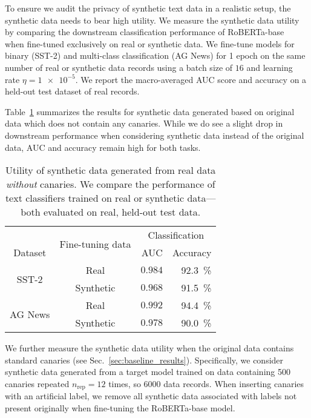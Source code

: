 
To ensure we audit the privacy of synthetic text data in a realistic setup, the synthetic data needs to bear high utility. We measure the synthetic data utility by comparing the downstream classification performance of RoBERTa-base~\citep{DBLP:journals/corr/abs-1907-11692} when fine-tuned exclusively on real or synthetic data. We fine-tune models for binary (SST-2) and multi-class classification (AG News) for 1 epoch on the same number of real or synthetic data records using a batch size of $16$ and learning rate $\eta = \num{1e-5}$. We report the macro-averaged AUC score and accuracy on a held-out test dataset of real records. 

Table~\ref{tab:utility_no_canaries} summarizes the results for synthetic data generated based on original data which does not contain any canaries. While we do see a slight drop in downstream performance when considering synthetic data instead of the original data, AUC and accuracy remain high for both tasks. 

\begin{table}[ht]
    \centering
    \begin{tabular}{ccrr}
    \toprule
        & \multirow{2}{*}{Fine-tuning data} & \multicolumn{2}{c}{Classification} \\
        \cmidrule(lr){3-4}
        Dataset &  & AUC & Accuracy \\
        \midrule 
        \multirow{2}{*}{\parbox{2cm}{\centering SST-2}} & Real & $0.984$ & \SI{92.3}{\percent} \\ 
         & Synthetic & $0.968$ & \SI{91.5}{\percent} \\
         \midrule
        \multirow{2}{*}{\parbox{2cm}{\centering AG News}} & Real & $0.992$ & \SI{94.4}{\percent} \\ 
         & Synthetic & $0.978$ & \SI{90.0}{\percent} \\ 
        \bottomrule
    \end{tabular}
    \caption{Utility of synthetic data generated from real data \emph{without} canaries. We compare the performance of text classifiers trained on real or synthetic data---both evaluated on real, held-out test data.}
    \label{tab:utility_no_canaries}
\end{table}

We further measure the synthetic data utility when the original data contains standard canaries (see Sec.~\ref{sec:baseline_results}). Specifically, we consider synthetic data generated from a target model trained on data containing \num{500} canaries repeated $n_\textrm{rep} = 12$ times, so \num{6000} data records. When inserting canaries with an artificial label, we remove all synthetic data associated with labels not present originally when fine-tuning the RoBERTa-base model. 

